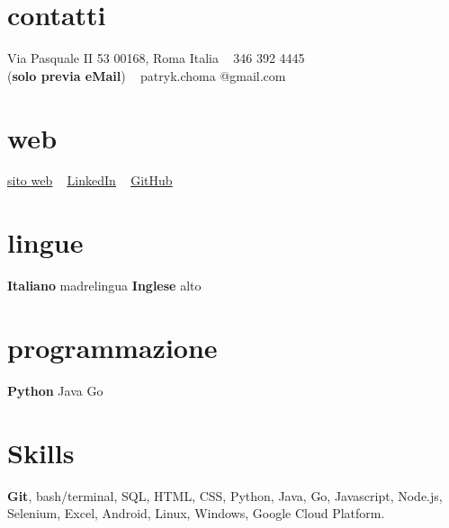 \documentclass[]{cv-style}          %
\begin{document}
\lastupdated


\begin{aside}
%
\section{contatti}
Via Pasquale II 53
00168, Roma
Italia
~
{\Telefon} 346 392 4445 \\(\textbf{solo previa eMail})
~
{\Email} patryk.choma
@gmail.com
%
\section{web}
\href{ch-pat.github.io/}{\underline{sito web}}
~
 \href{https://www.linkedin.com/in/p-choma/}{\underline{LinkedIn}}
~
 \href{https://github.com/ch-pat}{\underline{GitHub}}
%
\section{lingue}
\textbf{Italiano} madrelingua
\textbf{Inglese} alto
%
\section{programmazione}
\textbf{Python}
Java
Go
%
\end{aside}


\section{Skills}
  \vspace{-0.4cm}
  \textbf{Git}, bash/terminal, SQL, HTML, CSS, Python, Java, Go, Javascript, Node.js, Selenium, Excel, Android, Linux, Windows, Google Cloud Platform.

\end{document}
